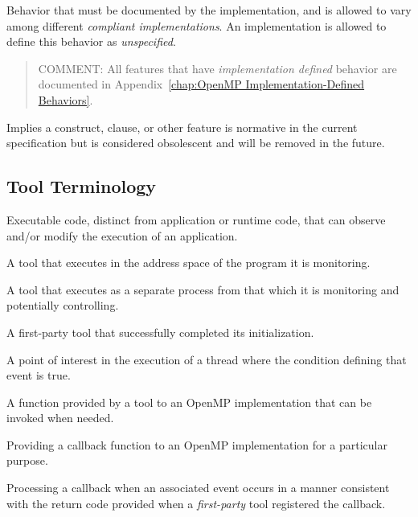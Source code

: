 \glossarydefstart
Behavior that must be documented by the implementation, and is allowed to vary
among different \emph{compliant implementations}. An implementation is allowed to
define this behavior as \emph{unspecified}.

\begin{quote}
COMMENT: All features that have \emph{implementation defined} behavior
are documented in Appendix~\ref{chap:OpenMP Implementation-Defined Behaviors}.
\end{quote}
\glossarydefend

\glossarydefstart
Implies a construct, clause, or other feature is normative in the current specification but is considered obsolescent and will be removed in the future.
\glossarydefend


\subsection{Tool Terminology}

\glossarydefstart
Executable code, distinct from application or runtime code, that can observe and/or modify the execution of an application.
\glossarydefend

\glossarydefstart
A tool that executes in the address space of the program it is monitoring.
\glossarydefend

\glossarydefstart
A tool that executes as a separate process from that which it is monitoring and potentially controlling.
\glossarydefend

\glossarydefstart
A first-party tool that successfully completed its initialization.
\glossarydefend

\glossarydefstart
A point of interest in the execution of a thread where the condition
defining that event is true.
\glossarydefend

\glossarydefstart
A function provided by a tool to an OpenMP implementation that can be invoked when needed.
\glossarydefend

\glossarydefstart
Providing a callback function to an OpenMP implementation for a particular purpose.
\glossarydefend

\glossarydefstart
Processing a callback when an associated event occurs in a manner consistent with the return code
provided when a \emph{first-party} tool registered the callback.
\glossarydefend

